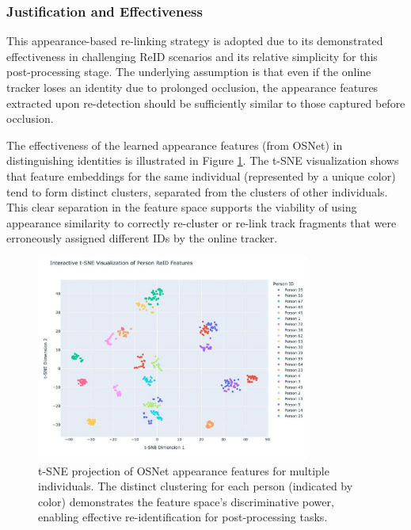 \documentclass[12pt, a4paper]{article}
\begin{document}
\subsubsection{Justification and Effectiveness}

This appearance-based re-linking strategy is adopted due to its demonstrated effectiveness in challenging ReID scenarios and its relative simplicity for this post-processing stage. The underlying assumption is that even if the online tracker loses an identity due to prolonged occlusion, the appearance features extracted upon re-detection should be sufficiently similar to those captured before occlusion.

The effectiveness of the learned appearance features (from OSNet) in distinguishing identities is illustrated in Figure \ref{fig:tsne_reid}. The t-SNE visualization shows that feature embeddings for the same individual (represented by a unique color) tend to form distinct clusters, separated from the clusters of other individuals. This clear separation in the feature space supports the viability of using appearance similarity to correctly re-cluster or re-link track fragments that were erroneously assigned different IDs by the online tracker.

\begin{figure}[H]
    \centering
    \includegraphics[width=0.8\textwidth]{pictures/tsne_inter_reid.jpeg}
    \caption{t-SNE projection of OSNet appearance features for multiple individuals. The distinct clustering for each person (indicated by color) demonstrates the feature space's discriminative power, enabling effective re-identification for post-processing tasks.}
    \label{fig:tsne_reid}
\end{figure}
\end{document}
